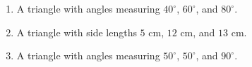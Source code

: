 \documentclass[12pt, letterpaper, fleqn]{article}
\begin{document}
\vspace{3mm}

\begin{enumerate}[itemsep=2.5cm, leftmargin=0.6cm, resume]
\item A triangle with angles measuring $40^\circ$, $60^\circ$, and $80^\circ$.
\item A triangle with side lengths $5\text{ cm}$, $12\text{ cm}$, and $13\text{ cm}$.
\item A triangle with angles measuring $50^\circ$, $50^\circ$, and $90^\circ$.
\end{enumerate}
\end{document}
